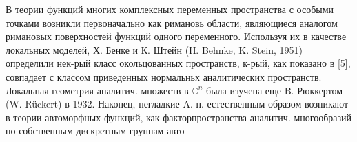 \documentclass[10pt]{article}
\begin{document}
В теории функций многих комплексных переменных пространства с особыми точками возникли первоначально как римановь области, являющиеся аналогом римановых поверхностей функций одного переменного. Используя их в качестве локальных моделей, Х. Бенке и К. Штейн (Н. Behnke, K. Stein, 1951) определили нек-рый класс окольцованных пространств, к-рый, как показано в [5], совпадает с классом приведенных нормальньх аналитических пространств. Локальная геометрия аналитич. множеств в $\mathbb{C}^{n}$ была изучена еще $\mathrm{B}$. Рюккертом (W. Rückert) в 1932. Наконец, негладкие A. п. естественным образом возникают в теории автоморфных функций, как факторпространства аналитич. многообразий по собственным дискретным группам авто-
\end{document}
